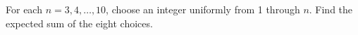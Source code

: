 For each $n=3,4,\ldots,10$, choose an integer uniformly from 1 through $n$. Find the expected sum of the eight choices.
